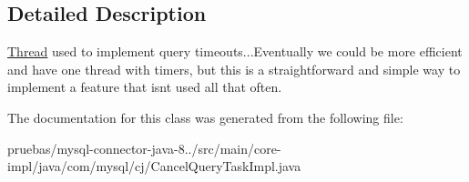 \subsection{Detailed Description}
\mbox{\hyperlink{class_thread}{Thread}} used to implement query timeouts...Eventually we could be more efficient and have one thread with timers, but this is a straightforward and simple way to implement a feature that isn\textquotesingle{}t used all that often. 

The documentation for this class was generated from the following file\+:\begin{DoxyCompactItemize}
\item 
pruebas/mysql-\/connector-\/java-\/8../src/main/core-\/impl/java/com/mysql/cj/Cancel\+Query\+Task\+Impl.\+java\end{DoxyCompactItemize}
